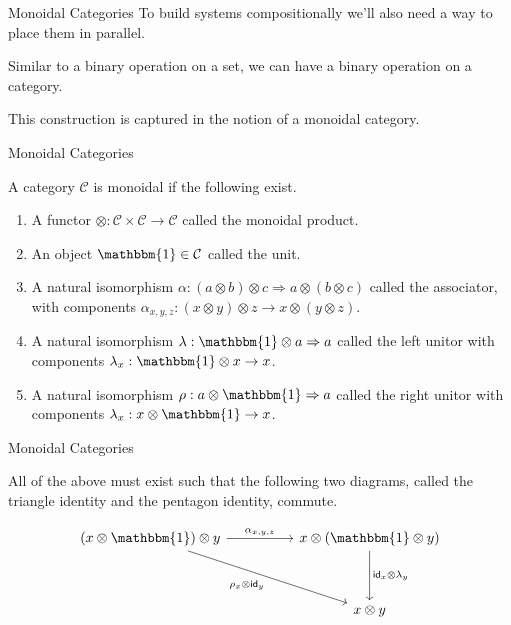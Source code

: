 \documentclass{beamer}
\begin{document}
\begin{frame}{Monoidal Categories}
    To build systems compositionally we'll also need a way to place them in parallel.

    \vspace*{0.125in}
    Similar to a binary operation on a set, we can have a binary operation on a category.

    \vspace*{0.125in}
    This construction is captured in the notion of a monoidal category.
\end{frame}


\begin{frame}{Monoidal Categories}
    \begin{definition}
        A category $\mathcal{C}$ is monoidal if the following exist.
        \begin{enumerate}
            \item A functor $\otimes:\mathcal{C}\times\mathcal{C}\rightarrow\mathcal{C}$ called the monoidal product.
            \item An object $\mathbbm{1}\in\mathcal{C}$ called the unit.
            \item A natural isomorphism $\alpha : (a\otimes b)\otimes c\Rightarrow a\otimes (b\otimes c)$ called the associator, with components $\alpha_{x,y,z}: (x\otimes y)\otimes z\rightarrow x\otimes (y\otimes z)$.
            \item A natural isomorphism $\lambda : \mathbbm{1}\otimes a\Rightarrow a$ called the left unitor with components $\lambda_x : \mathbbm{1}\otimes x\rightarrow x$.
            \item A natural isomorphism $\rho : a\otimes \mathbbm{1}\Rightarrow a$ called the right unitor with components $\lambda_x : x\otimes \mathbbm{1}\rightarrow x$.
        \end{enumerate}
    \end{definition}
\end{frame}

\begin{frame}[fragile]{Monoidal Categories}
    \begin{definition}
        All of the above must exist such that the following two diagrams, called the triangle identity and the pentagon identity, commute.

        \vspace*{0.5in}
        \[\begin{tikzcd}
                {(x\otimes\mathbbm{1})\otimes y} && {x\otimes(\mathbbm{1}\otimes y)} \\
                \\
                && {x\otimes y}
                \arrow["{{\rho_x\otimes \mathsf{id}_y}}"', from=1-1, to=3-3]
                \arrow["{{\mathsf{id}_x\otimes\lambda_y}}", from=1-3, to=3-3]
                \arrow["{{\alpha_{x,y,z}}}", from=1-1, to=1-3]
            \end{tikzcd}\]
    \end{definition}
\end{frame}
\end{document}
